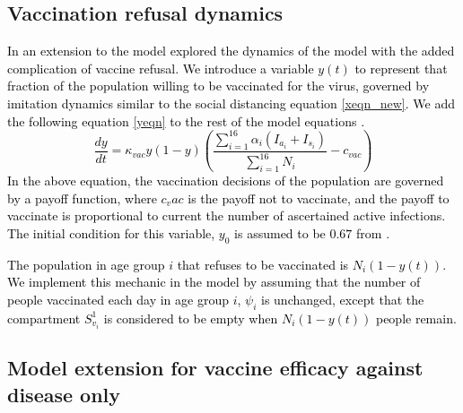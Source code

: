 \documentclass[10pt,onecolumn,twoside,lineno]{pnas-new}
\begin{document}
\subsection*{Vaccination refusal dynamics}
\textcolor{black}{In an extension to the model explored the dynamics of the model with the added complication of vaccine refusal. We introduce a variable $y(t)$ to represent that fraction of the population willing to be vaccinated for the virus, governed by imitation dynamics similar to the social distancing equation \ref{xeqn_new}. We add the following equation \ref{yeqn} to the rest of the model equations \cite{bauch2005imitation, bauch2012evolutionary}.
\begin{equation}
    \frac{d y}{dt} = \kappa_{vac} y(1 - y)\left(\frac{\sum_{i=1}^{16}\alpha_i(I_{a_i} + I_{s_i})}{\sum_{i=1}^{16} N_i} - c_{vac}\right)
    \label{yeqn}
\end{equation}
In the above equation, the vaccination decisions of the population are governed by a payoff function, where $c_vac$ is the payoff not to vaccinate, and the payoff to vaccinate is proportional to current the number of ascertained active infections. The initial condition for this variable, $y_0$ is assumed to be $0.67$ from \cite{MALIK2020100495}.}

\textcolor{black}{The population in age group $i$ that refuses to be vaccinated is $N_i (1 - y(t))$. We implement this mechanic in the model by assuming that the number of people vaccinated each day in age group $i$, $\psi_i$ is unchanged, except that the compartment $S_{v_i}^1$ is considered to be empty when $N_i (1 - y(t))$ people remain.}


\subsection*{Model extension for vaccine efficacy against disease only}
\end{document}
